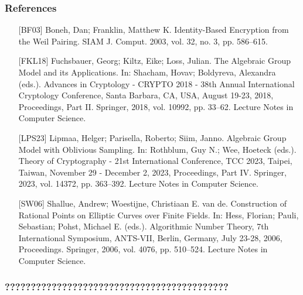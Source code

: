 \documentclass[9pt]{beamer}
\begin{document}
\begin{frame}
\frametitle{References}
\begin{itemize}
    \item[{[}BF03{]}] Boneh, Dan; Franklin, Matthew K. Identity-Based Encryption from the Weil Pairing. SIAM J. Comput. 2003, vol. 32, no. 3, pp. 586–615.
    \item[{[}FKL18{]}] Fuchsbauer, Georg; Kiltz, Eike; Loss, Julian. The Algebraic Group Model and its Applications. In: Shacham, Hovav; Boldyreva, Alexandra (eds.). Advances in Cryptology - CRYPTO 2018 - 38th Annual International Cryptology Conference, Santa Barbara, CA, USA, August 19-23, 2018, Proceedings, Part II. Springer, 2018, vol. 10992, pp. 33–62. Lecture Notes in Computer Science.
    \item[{[}LPS23{]}] Lipmaa, Helger; Parisella, Roberto; Siim, Janno. Algebraic Group Model with Oblivious Sampling. In: Rothblum, Guy N.; Wee, Hoeteck (eds.). Theory of Cryptography - 21st International Conference, TCC 2023, Taipei, Taiwan, November 29 - December 2, 2023, Proceedings, Part IV. Springer, 2023, vol. 14372, pp. 363–392. Lecture Notes in Computer Science.
    \item[{[}SW06{]}] Shallue, Andrew; Woestijne, Christiaan E. van de. Construction of Rational Points on Elliptic Curves over Finite Fields. In: Hess, Florian; Pauli, Sebastian; Pohst, Michael E. (eds.). Algorithmic Number Theory, 7th International Symposium, ANTS-VII, Berlin, Germany, July 23-28, 2006, Proceedings. Springer, 2006, vol. 4076, pp. 510–524. Lecture Notes in Computer Science.
\end{itemize}
\end{frame}


\begin{frame}
\frametitle{???????????????????????????????????????????}
\end{frame}
\end{document}
